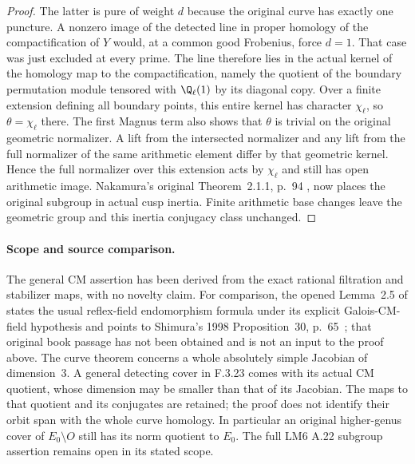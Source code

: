 \begin{proof}
The latter is pure of weight $d$ because the
original curve has exactly one puncture.
A nonzero image of the detected line in proper
homology of the compactification of $Y$ would,
at a common good Frobenius, force $d=1$.
That case was just excluded at every prime.
The line therefore lies in the actual kernel
of the homology map to the compactification,
namely the quotient of the boundary permutation
module tensored with $\Q_\ell(1)$ by its diagonal
copy. Over a finite extension defining all
boundary points, this entire kernel has character
$\chi_\ell$, so $\theta=\chi_\ell$ there.
The first Magnus term also shows that $\theta$
is trivial on the original geometric normalizer.
A lift from the intersected normalizer and any
lift from the full normalizer of the same
arithmetic element differ by that geometric
kernel. Hence the full normalizer over this
extension acts by $\chi_\ell$ and still has
open arithmetic image. Nakamura's original
Theorem~2.1.1, p.~94 \cite{AuditNakamura1994},
now places the original subgroup in actual
cusp inertia. Finite arithmetic base changes
leave the geometric group and this inertia
conjugacy class unchanged.
\end{proof}

\paragraph{Scope and source comparison.}
The general CM assertion has been derived from the exact
rational filtration and stabilizer maps, with no novelty
claim. For comparison, the opened Lemma~2.5 of
\cite{AuditGoodman2026} states the usual reflex-field
endomorphism formula under its explicit Galois-CM-field
hypothesis and points to Shimura's 1998 Proposition~30,
p.~65~\cite{AuditShimura1998Gate}; that original book passage has not been obtained
and is not an input to the proof above.
The curve theorem concerns a whole absolutely simple
Jacobian of dimension~3. A general detecting cover in
F.3.23 comes with its actual CM quotient, whose dimension
may be smaller than that of its Jacobian. The maps to
that quotient and its conjugates are retained; the
proof does not identify their orbit span with the whole
curve homology. In particular an original higher-genus
cover of $E_0\setminus O$ still has its norm quotient
to $E_0$. The full LM6 A.22 subgroup assertion remains
open in its stated scope.
